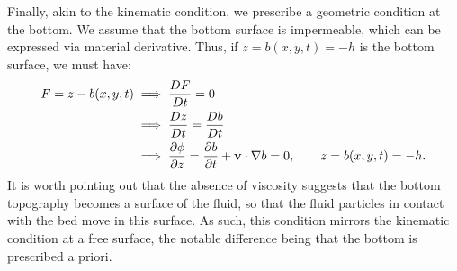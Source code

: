 \documentclass[10pt,reqno,oneside,a4paper]{article}
\begin{document}
Finally, akin to the kinematic condition, we prescribe a geometric condition at the bottom. We assume that the bottom surface is impermeable, which can be expressed via material derivative. Thus, if $z = b(x,y,t) = -h$ is the bottom surface, we must have:
\begin{align*}
F = z - b(x,y,t) &\implies \frac{DF}{Dt} = 0 \\
&\implies \frac{Dz}{Dt} = \frac{D b}{Dt} \\
&\implies \frac{\partial \phi}{\partial z} = \frac{\partial b}{\partial t} + {\bf v} \cdot \nabla b = 0, \qquad z = b(x,y,t)= - h.
\end{align*}
It is worth pointing out that the absence of viscosity suggests that the bottom topography becomes a surface of the fluid, so that the fluid particles in contact with the bed move in this surface. As such, this condition mirrors the kinematic condition at a free surface, the notable difference being that the bottom is prescribed a priori. 
\end{document}
